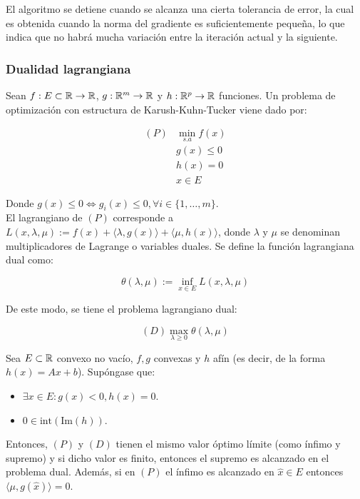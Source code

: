 El algoritmo se detiene cuando se alcanza una cierta tolerancia de error, la cual es obtenida cuando la norma del gradiente es suficientemente pequeña, lo que indica que no habrá mucha variación entre la iteración actual y la siguiente.

\subsubsection{Dualidad lagrangiana}

Sean $f:E\subset{\mathbb R}\to{\mathbb R}$, $g:{\mathbb R}^m \to {\mathbb R}$ y $h:{\mathbb R}^p \to {\mathbb R}$ funciones. Un problema de optimización con estructura de Karush-Kuhn-Tucker viene dado por:

	\begin{align*}
		(P) & \min_{s.a} f(x)\\
		& g(x) \leq 0\\
		& h(x) = 0\\
		& x\in E
	\end{align*}

Donde $g(x) \leq 0\iff g_i(x)\leq 0,\forall i\in\{1,\ldots,m\}$.\\

El lagrangiano de $(P)$ corresponde a $L(x,\lambda,\mu) := f(x) + \langle\lambda,g(x)\rangle + \langle\mu,h(x)\rangle$, donde $\lambda$ y $\mu$ se denominan multiplicadores de Lagrange o variables duales. Se define la función lagrangiana dual como:

\begin{equation*}
	\theta(\lambda,\mu):=\inf_{x\in E} L(x,\lambda,\mu)
\end{equation*} 

De este modo, se tiene el problema lagrangiano dual:

\begin{equation*}
	(D) \max_{\lambda\geq 0} \theta(\lambda,\mu)
\end{equation*}

\begin{theorem}
	Sea $E\subset{\mathbb R}$ convexo no vacío, $f,g$ convexas y $h$ afín (es decir, de la forma $h(x) = Ax+b$). Supóngase que:

\begin{itemize}
	\item $\exists x\in E:g(x)<0, h(x)=0$.
	\item $0\in \text{int}(\text{Im}(h))$.
\end{itemize}

Entonces, $(P)$ y $(D)$ tienen el mismo valor óptimo límite (como ínfimo y supremo) y si dicho valor es finito, entonces el supremo es alcanzado en el problema dual. Además, si en $(P)$ el ínfimo es alcanzado en $\hat{x}\in E$ entonces $\langle \mu,g(\hat{x})\rangle=0$.
\end{theorem}
	
